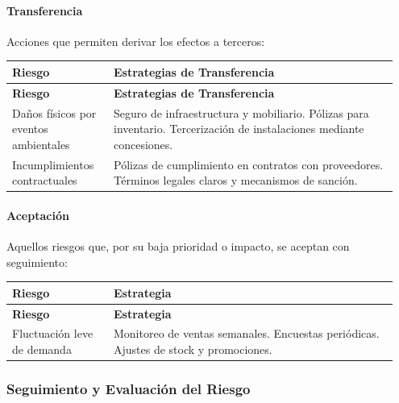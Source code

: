 \documentclass[letterpaper, 11pt]{report}
\begin{document}
\paragraph{Transferencia}\hfill{}\break{}
Acciones que permiten derivar los efectos a terceros:

\begin{longtable}{|p{0.25\linewidth}|p{0.7\linewidth}|}
\hline
\textbf{Riesgo} & \textbf{Estrategias de Transferencia} \\
\hline
\endfirsthead

\hline
\textbf{Riesgo} & \textbf{Estrategias de Transferencia} \\
\hline
\endhead

\hline
\endfoot

\hline
\endlastfoot

Daños físicos por eventos ambientales & Seguro de infraestructura y mobiliario. Pólizas para inventario. Tercerización de instalaciones mediante concesiones. \\
\hline
Incumplimientos contractuales & Pólizas de cumplimiento en contratos con proveedores. Términos legales claros y mecanismos de sanción. \\
\hline
\end{longtable}

\paragraph{Aceptación}\hfill{}\break{}
Aquellos riesgos que, por su baja prioridad o impacto, se aceptan con seguimiento:

\begin{longtable}{|p{0.25\linewidth}|p{0.7\linewidth}|}
\hline
\textbf{Riesgo} & \textbf{Estrategia} \\
\hline
\endfirsthead

\hline
\textbf{Riesgo} & \textbf{Estrategia} \\
\hline
\endhead

\hline
\endfoot

\hline
\endlastfoot

Fluctuación leve de demanda & Monitoreo de ventas semanales. Encuestas periódicas. Ajustes de stock y promociones. \\
\hline
\end{longtable}

\subsubsection{Seguimiento y Evaluación del Riesgo}
\end{document}
